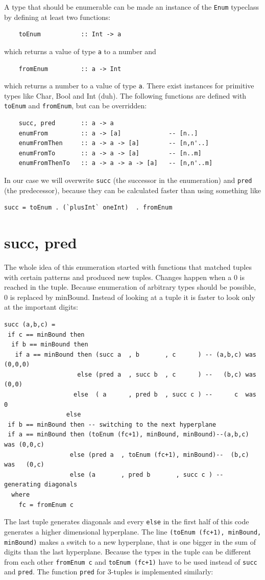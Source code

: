 \documentclass{tmr}
\begin{document}
A type that should be enumerable can be made an instance of the \verb|Enum| typeclass by defining at least two functions:
\begin{Verbatim}
    toEnum           :: Int -> a
\end{Verbatim}
which returns a value of type \verb|a| to a number and
\begin{Verbatim}
    fromEnum         :: a -> Int
\end{Verbatim}
which returns a number to a value of type \verb|a|. There exist instances for primitive types like Char, Bool and Int (duh). 
The following functions are defined with \verb|toEnum| and \verb|fromEnum|, but can be overridden:

\begin{Verbatim}
    succ, pred       :: a -> a
    enumFrom         :: a -> [a]             -- [n..]
    enumFromThen     :: a -> a -> [a]        -- [n,n'..]
    enumFromTo       :: a -> a -> [a]        -- [n..m]
    enumFromThenTo   :: a -> a -> a -> [a]   -- [n,n'..m]
\end{Verbatim}

In our case we will overwrite \verb|succ| (the successor in the enumeration) and \verb|pred| (the predecessor), because they can be calculated faster than using something like
\begin{Verbatim}
succ = toEnum . (`plusInt` oneInt)  . fromEnum
\end{Verbatim}

\section{succ, pred}
The whole idea of this enumeration started with functions that matched tuples with certain patterns and produced new tuples. Changes happen when a 0 is reached in the tuple. Because enumeration of arbitrary types should be possible, 0 is replaced by minBound. Instead of looking at a tuple it is faster to look only at the important digits:
\small
\begin{Verbatim}
succ (a,b,c) =
 if c == minBound then
  if b == minBound then
   if a == minBound then (succ a  , b       , c      ) -- (a,b,c) was (0,0,0)
                    else (pred a  , succ b  , c      ) --   (b,c) was   (0,0)
                   else  ( a      , pred b  , succ c ) --      c  was      0
                 else
 if b == minBound then -- switching to the next hyperplane
 if a == minBound then (toEnum (fc+1), minBound, minBound)--(a,b,c) was (0,0,c)
                  else (pred a  , toEnum (fc+1), minBound)--  (b,c) was   (0,c)
                  else (a       , pred b       , succ c ) -- generating diagonals
  where
    fc = fromEnum c
\end{Verbatim}
The last tuple generates diagonals and every \verb|else| in the first half of this code generates a higher dimensional hyperplane.
The line \verb|(toEnum (fc+1), minBound, minBound)| makes a switch to a new hyperplane, that is one bigger in the sum of digits than the last hyperplane. Because the types in the tuple can be different from each other \verb|fromEnum c| and \verb|toEnum (fc+1)| have to be used instead of \verb|succ| and \verb|pred|. The function \verb|pred| for 3-tuples is implemented similarly:
\end{document}
